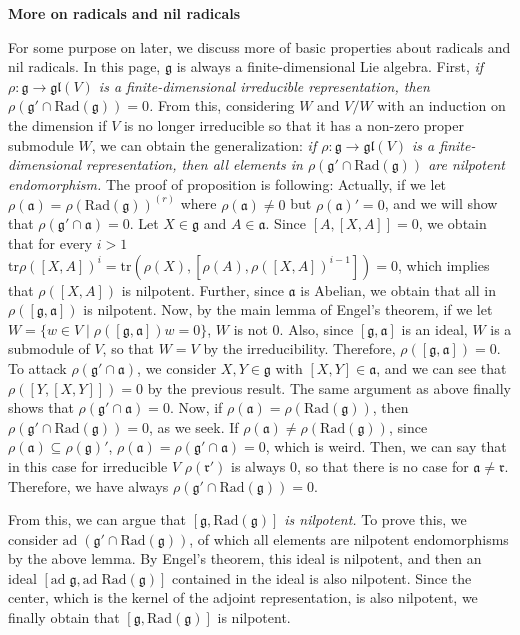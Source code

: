 \documentclass{article}
\newcommand{\SBar}{\;|\;}
\newcommand{\tr}[1]{\mathrm{tr}#1}
\newcommand{\lie}[1]{\mathfrak{#1}}
\newcommand{\ad}[1]{\mathrm{ad}\; #1}
\newcommand{\Rad}[1]{\mathrm{Rad}(#1)}
\begin{document}
\textbf{More on radicals and nil radicals}

For some purpose on later, we discuss more of basic properties about radicals and nil radicals.
In this page, $\lie{g}$ is always a finite-dimensional Lie algebra.
First, \textit{if $\rho : \lie{g} \to \lie{gl}(V)$ is a finite-dimensional irreducible representation, then $\rho(\lie{g}' \cap \Rad{\lie{g}}) = 0$.}
From this, considering $W$ and $V/W$ with an induction on the dimension if $V$ is no longer irreducible so that it has a non-zero proper submodule $W$, we can obtain the generalization: \textit{if $\rho : \lie{g} \to \lie{gl}(V)$ is a finite-dimensional representation, then all elements in $\rho(\lie{g}' \cap \Rad{\lie{g}})$ are nilpotent endomorphism.}
The proof of proposition is following: Actually, if we let $\rho(\lie{a}) = \rho(\Rad{\lie{g}})^{(r)}$ where $\rho(\lie{a}) \ne 0$ but $\rho(\lie{a})' = 0$, and we will show that $\rho(\lie{g}' \cap \lie{a}) = 0$.
Let $X \in \lie{g}$ and $A \in \lie{a}$.
Since $[A, [X, A]] = 0$, we obtain that for every $i > 1$ $\tr{\rho([X, A])^i} = \tr{(\rho(X), [\rho(A), \rho([X, A])^{i - 1}])} = 0$, which implies that $\rho([X, A])$ is nilpotent.
Further, since $\lie{a}$ is Abelian, we obtain that all in $\rho([\lie{g}, \lie{a}])$ is nilpotent.
Now, by the main lemma of Engel's theorem, if we let $W = \{ w \in V \SBar \rho([\lie{g}, \lie{a}])w = 0 \}$, $W$ is not 0.
Also, since $[\lie{g}, \lie{a}]$ is an ideal, $W$ is a submodule of $V$, so that $W = V$ by the irreducibility.
Therefore, $\rho([\lie{g}, \lie{a}]) = 0$.
To attack $\rho(\lie{g}' \cap \lie{a})$, we consider $X, Y \in \lie{g}$ with $[X, Y] \in \lie{a}$, and we can see that $\rho([Y, [X, Y]]) = 0$ by the previous result.
The same argument as above finally shows that $\rho(\lie{g}' \cap \lie{a}) = 0$.
Now, if $\rho(\lie{a}) = \rho(\Rad{\lie{g}})$, then $\rho(\lie{g}' \cap \Rad{\lie{g}}) = 0$, as we seek.
If $\rho(\lie{a}) \ne \rho(\Rad{\lie{g}})$, since $\rho(\lie{a}) \subseteq \rho(\lie{g})'$, $\rho(\lie{a}) = \rho(\lie{g}' \cap \lie{a}) = 0$, which is weird.
Then, we can say that in this case for irreducible $V$ $\rho(\lie{r}')$ is always 0, so that there is no case for $\lie{a} \ne \lie{r}$.
Therefore, we have always $\rho(\lie{g}' \cap \Rad{\lie{g}}) = 0$.

From this, we can argue that \textit{$[\lie{g}, \Rad{\lie{g}}]$ is nilpotent.}
To prove this, we consider $\ad{(\lie{g}' \cap \Rad{\lie{g}})}$, of which all elements are nilpotent endomorphisms by the above lemma.
By Engel's theorem, this ideal is nilpotent, and then an ideal $[\ad{\lie{g}}, \ad{\Rad{\lie{g}}}]$ contained in the ideal is also nilpotent.
Since the center, which is the kernel of the adjoint representation, is also nilpotent, we finally obtain that $[\lie{g}, \Rad{\lie{g}}]$ is nilpotent.
\end{document}
